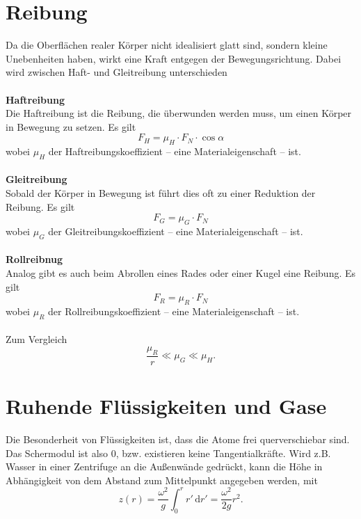 \documentclass[a4paper,12pt]{article}
\newcommand{\td}{\,\text{d}}
\numberwithin{equation}{section}
\begin{document}
\section{Reibung}
Da die Oberflächen realer Körper nicht idealisiert glatt sind, sondern kleine Unebenheiten haben, wirkt eine Kraft entgegen der Bewegungsrichtung. Dabei wird zwischen Haft- und Gleitreibung unterschieden
\\\hfill\\\textbf{Haftreibung}\\ 
Die Haftreibung ist die Reibung, die überwunden werden muss, um einen Körper in Bewegung zu setzen. Es gilt
\[ 
        F_H=\mu _H\cdot F_N\cdot \cos \alpha 
\] 
wobei $\mu _H$ der Haftreibungskoeffizient -- eine Materialeigenschaft -- ist.
\\\hfill\\\textbf{Gleitreibung}\\ 
Sobald der Körper in Bewegung ist führt dies oft zu einer Reduktion der Reibung. Es gilt
\[ 
        F_G=\mu _G\cdot F_N
\] 
wobei $\mu _G$ der Gleitreibungskoeffizient -- eine Materialeigenschaft -- ist.
\\\hfill\\\textbf{Rollreibnug}\\ 
Analog gibt es auch beim Abrollen eines Rades oder einer Kugel eine Reibung. Es gilt
\[ 
        F_R=\mu _R\cdot F_N
\] 
wobei $\mu _R$ der Rollreibungskoeffizient -- eine Materialeigenschaft -- ist.\\\\
Zum Vergleich
\[ 
        \dfrac{\mu _R}{r}\ll\mu _G\ll\mu _H
.\] 

\section{Ruhende Flüssigkeiten und Gase}
Die Besonderheit von Flüssigkeiten ist, dass die Atome frei querverschiebar sind. Das Schermodul ist also 0, bzw. existieren keine Tangentialkräfte. Wird z.B. Wasser in einer Zentrifuge an die Außenwände gedrückt, kann die Höhe in Abhängigkeit von dem Abstand zum Mittelpunkt angegeben werden, mit
\[ 
        z\left(r\right)=\dfrac{\omega ^2}{g}\int_{0}^{r}r'\td r'=\dfrac{\omega ^2}{2g}r^2
.\] 
\end{document}
